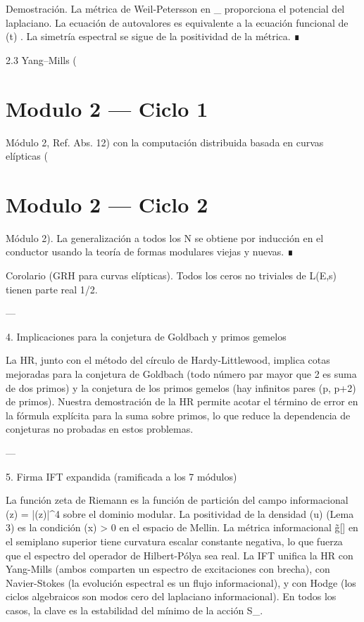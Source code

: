 \documentclass[12pt,twoside]{book}
\begin{document}
Demostración. La métrica de Weil‑Petersson en  _{}  proporciona el potencial del laplaciano. La ecuación de autovalores es equivalente a la ecuación funcional de  \Xi(t) . La simetría espectral se sigue de la positividad de la métrica. ∎

2.3 Yang–Mills (

\chapter{Modulo 2 — Ciclo 1}
Módulo 2, Ref. Abs. 12) con la computación distribuida basada en curvas elípticas (

\chapter{Modulo 2 — Ciclo 2}
Módulo 2). La generalización a todos los N se obtiene por inducción en el conductor usando la teoría de formas modulares viejas y nuevas. ∎

Corolario (GRH para curvas elípticas). Todos los ceros no triviales de L(E,s) tienen parte real 1/2.

---

4. Implicaciones para la conjetura de Goldbach y primos gemelos

La HR, junto con el método del círculo de Hardy-Littlewood, implica cotas mejoradas para la conjetura de Goldbach (todo número par mayor que 2 es suma de dos primos) y la conjetura de los primos gemelos (hay infinitos pares (p, p+2) de primos). Nuestra demostración de la HR permite acotar el término de error en la fórmula explícita para la suma sobre primos, lo que reduce la dependencia de conjeturas no probadas en estos problemas.

---

5. Firma IFT expandida (ramificada a los 7 módulos)

La función zeta de Riemann es la función de partición del campo informacional \rho(z) = |\eta(z)|^4 sobre el dominio modular. La positividad de la densidad \Phi(u) (Lema 3) es la condición \rho(x) > 0 en el espacio de Mellin. La métrica informacional g̃[\rho] en el semiplano superior tiene curvatura escalar constante negativa, lo que fuerza que el espectro del operador de Hilbert-Pólya sea real. La IFT unifica la HR con Yang-Mills (ambos comparten un espectro de excitaciones con brecha), con Navier-Stokes (la evolución espectral es un flujo informacional), y con Hodge (los ciclos algebraicos son modos cero del laplaciano informacional). En todos los casos, la clave es la estabilidad del mínimo de la acción S_{}.
\end{document}
